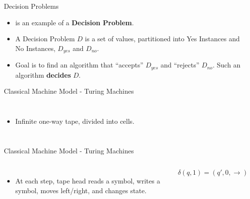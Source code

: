\documentclass[c]{beamer}
\begin{document}
\begin{frame}{Decision Problems}

  \begin{itemize}
  \item[] \subsum{} is an example of a \textbf{Decision Problem}.\pause

    \vspace{\baselineskip}

  \item[] A Decision Problem $D$ is a set of values, partitioned into
    Yes Instances and No Instances, $D_{yes}$ and $D_{no}$.

  \item[] Goal is to find an algorithm that ``accepts'' $D_{yes}$ and
    ``rejects'' $D_{no}$.  Such an algorithm \textbf{decides} $D$.
  \end{itemize}

\end{frame}

\begin{frame}{Classical Machine Model - Turing Machines}
  \begin{columns}

    \begin{itemize}
    \item[] Infinite one-way tape, divided into cells.    
    \end{itemize}
  \end{columns}
\end{frame}

\begin{frame}{Classical Machine Model - Turing Machines}
  \begin{columns}

    \begin{itemize}
    \item At each step, tape head reads a symbol, writes a symbol,
      moves left/right, and changes state.
    \end{itemize}
    
    $$\delta(q, 1) = (q', 0, \rightarrow)$$
  \end{columns}
\end{frame}
\end{document}

